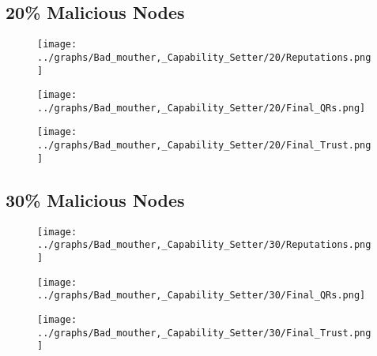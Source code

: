 \documentclass{article}
\begin{document}
  \begin{minipage}[t]{0.49\columnwidth}
    \subsection*{20\% Malicious Nodes}
        \begin{figure}[H]
            \centering
            \texttt{[image: ../graphs/Bad\_mouther,\_Capability\_Setter/20/Reputations.png]}
        \end{figure}
        \begin{figure}[H]
            \centering
            \texttt{[image: ../graphs/Bad\_mouther,\_Capability\_Setter/20/Final\_QRs.png]}
        \end{figure}
    \end{minipage}
    \begin{minipage}[t]{0.49\columnwidth}
        \begin{figure}[H]
            \centering
            \texttt{[image: ../graphs/Bad\_mouther,\_Capability\_Setter/20/Final\_Trust.png]}
        \end{figure}
    \end{minipage}

  \begin{minipage}[t]{0.49\columnwidth}
    \subsection*{30\% Malicious Nodes}
        \begin{figure}[H]
            \centering
            \texttt{[image: ../graphs/Bad\_mouther,\_Capability\_Setter/30/Reputations.png]}
        \end{figure}
        \begin{figure}[H]
            \centering
            \texttt{[image: ../graphs/Bad\_mouther,\_Capability\_Setter/30/Final\_QRs.png]}
        \end{figure}
    \end{minipage}
    \begin{minipage}[t]{0.49\columnwidth}
        \begin{figure}[H]
            \centering
            \texttt{[image: ../graphs/Bad\_mouther,\_Capability\_Setter/30/Final\_Trust.png]}
        \end{figure}
    \end{minipage}
\end{document}
